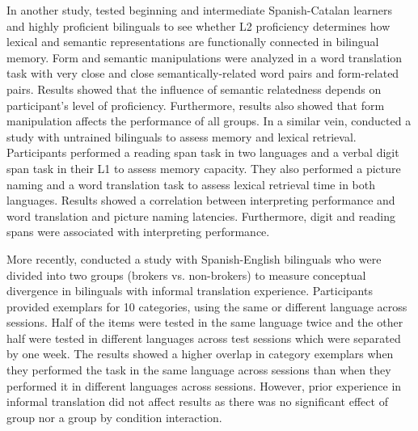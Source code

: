 \documentclass[output=paper]{langscibook}
\begin{document}
In another study, \citet{guasch2008translation} tested beginning and intermediate Span\-ish-Catalan learners and highly proficient bilinguals to see whether L2 proficiency determines how lexical and semantic representations are functionally connected in bilingual memory. Form and semantic manipulations were analyzed in a word translation task with very close and close semantically-related word pairs and form-related pairs. Results showed that the influence of semantic relatedness depends on participant’s level of proficiency. Furthermore, results also showed that form manipulation affects the performance of all groups. In a similar vein, \citet{christoffels2003basic} conducted a study with untrained bilinguals to assess memory and lexical retrieval. Participants performed a reading span task in two languages and a verbal digit span task in their L1 to assess memory capacity. They also performed a picture naming and a word translation task to assess lexical retrieval time in both languages. Results showed a correlation between interpreting performance and word translation and picture naming latencies. Furthermore, digit and reading spans were associated with interpreting performance.

More recently, \citet{lopez2018facil} conducted a study with Spanish-English bilinguals who were divided into two groups (brokers vs. non-brokers) to measure conceptual divergence in bilinguals with informal translation experience. Participants provided exemplars for 10 categories, using the same or different language across sessions. Half of the items were tested in the same language twice and the other half were tested in different languages across test sessions which were separated by one week. The results showed a higher overlap in category exemplars when they performed the task in the same language across sessions than when they performed it in different languages across sessions. However, prior experience in informal translation did not affect results as there was no significant effect of group nor a group by condition interaction. 
\end{document}
